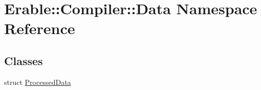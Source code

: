 \hypertarget{namespace_erable_1_1_compiler_1_1_data}{}\section{Erable\+::Compiler\+::Data Namespace Reference}
\label{namespace_erable_1_1_compiler_1_1_data}
\subsection*{Classes}
\begin{DoxyCompactItemize}
\item 
struct \mbox{\hyperlink{struct_erable_1_1_compiler_1_1_data_1_1_processed_data}{Processed\+Data}}
\end{DoxyCompactItemize}
